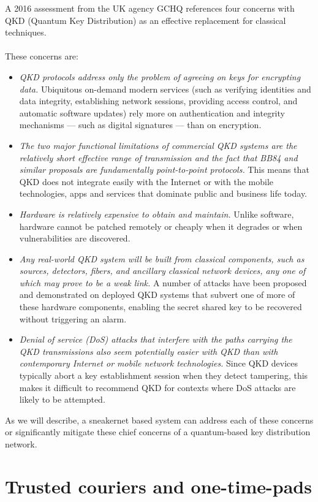 \documentclass[aps,prl,twocolumn,10pt,nofootinbib]{revtex4}
\begin{document}
A 2016 assessment from the UK agency GCHQ references four concerns with QKD (Quantum Key Distribution) as an effective replacement for classical techniques.  
\\
\\
These concerns are:
\begin{itemize}
\item {\em QKD protocols address only the problem of agreeing on keys for encrypting data.} Ubiquitous on-demand modern services (such as verifying identities and data integrity, establishing network sessions, providing access control, and automatic software updates) rely more on authentication and integrity mechanisms — such as digital signatures — than on encryption.
\item {\em The two major functional limitations of commercial QKD systems are the relatively short effective range of transmission and the fact that BB84 and similar proposals are fundamentally point-to-point protocols.} This means that QKD does not integrate easily with the Internet or with the mobile technologies, apps and services that dominate public and business life today.
\item {\em Hardware is relatively expensive to obtain and maintain.} Unlike software, hardware cannot be patched remotely or cheaply when it degrades or when vulnerabilities are discovered.
\item {\em Any real-world QKD system will be built from classical components, such as sources, detectors, fibers, and ancillary classical network devices, any one of which may prove to be a weak link.}  A number of attacks have been proposed and demonstrated on deployed QKD systems that subvert one of more of these hardware components, enabling the secret shared key to be recovered without triggering an alarm.
\item {\em Denial of service (DoS) attacks that interfere with the paths carrying the QKD transmissions also seem potentially easier with QKD than with contemporary Internet or mobile network technologies.} Since QKD devices typically abort a key establishment session when they detect tampering, this makes it difficult to recommend QKD for contexts where DoS attacks are likely to be attempted.
\end{itemize}

As we will describe, a sneakernet based system can address each of these concerns or significantly mitigate these chief concerns of a quantum-based key distribution network.

\section{Trusted couriers and one-time-pads}
\end{document}
